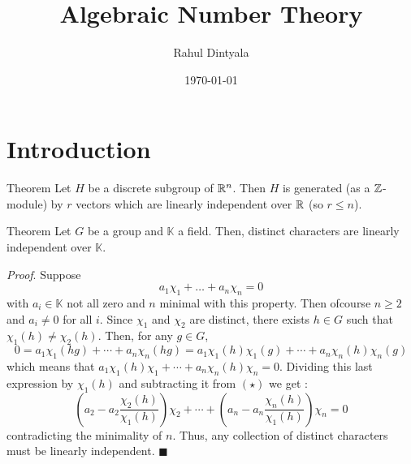 \documentclass[9pt]{beamer}
\title{Algebraic Number Theory}
\author{Rahul Dintyala}
\date{\today}
\def\Z{\ensuremath\mathbb{Z}}
\def\R{\ensuremath\mathbb{R}}
\begin{document}
\begin{frame}
\titlepage
\end{frame}

\section{Introduction}

\begin{frame}
  \begin{block}{Theorem}
    Let $H$ be a discrete subgroup of $\R^n$. Then $H$ is generated (as a $\Z$-module) by $r$ vectors which are linearly independent over $\R$ (so $r\leq n$).
  \end{block}
\end{frame}

\begin{frame}
  \begin{block}{Theorem}
    Let $G$ be a group and $\mathbb{K}$ a field. Then, distinct characters are linearly independent over $\mathbb{K}$.
  \end{block}
  \textit{Proof}.
  Suppose
  \[a_1 \chi_1 + \ldots + a_n \chi_n = 0\tag{$\star$}\]
  with $a_i \in \mathbb{K}$ not all zero and $n$ minimal with this property. Then ofcourse $n\geq 2$ and $a_i \neq 0$ for all $i$. Since $\chi_1$ and $\chi_2$ are distinct, there exists $h\in G$ such that $\chi_1(h)\neq \chi_2(h)$. Then, for any $g\in G$,
  \[0 = a_1\chi_1(hg)+\cdots+a_n \chi_n(hg) = a_1 \chi_1(h)\chi_1(g)+\cdots+a_n \chi_n(h)\chi_n(g)\]
  which means that $a_1 \chi_1(h)\chi_1+\cdots+a_n \chi_n(h)\chi_n = 0$. Dividing this last expression by $\chi_1(h)$ and subtracting it from $(\star)$ we get :
  \[\left(a_2 - a_2 \frac{\chi_2(h)}{\chi_1(h)}\right)\chi_2 + \cdots + \left(a_n - a_n \frac{\chi_n(h)}{\chi_1(h)}\right)\chi_n = 0 \]
  contradicting the minimality of $n$. Thus, any collection of distinct characters must be linearly independent. \hfill $\blacksquare$
\end{frame}
\end{document}
